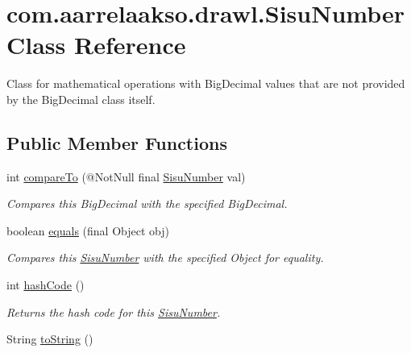 \hypertarget{classcom_1_1aarrelaakso_1_1drawl_1_1_sisu_number}{}\section{com.\+aarrelaakso.\+drawl.\+Sisu\+Number Class Reference}
\label{classcom_1_1aarrelaakso_1_1drawl_1_1_sisu_number}


Class for mathematical operations with Big\+Decimal values that are not provided by the Big\+Decimal class itself.  


\subsection*{Public Member Functions}
\begin{DoxyCompactItemize}
\item 
int \hyperlink{classcom_1_1aarrelaakso_1_1drawl_1_1_sisu_number_a554f83d5273ba11b53e1c82743a7ece0}{compare\+To} (@Not\+Null final \hyperlink{classcom_1_1aarrelaakso_1_1drawl_1_1_sisu_number}{Sisu\+Number} val)
\begin{DoxyCompactList}\small\item\em Compares this Big\+Decimal with the specified Big\+Decimal. \end{DoxyCompactList}\item 
boolean \hyperlink{classcom_1_1aarrelaakso_1_1drawl_1_1_sisu_number_afb509c2c09d10318b136e4defbedd47e}{equals} (final Object obj)
\begin{DoxyCompactList}\small\item\em Compares this \hyperlink{classcom_1_1aarrelaakso_1_1drawl_1_1_sisu_number}{Sisu\+Number} with the specified Object for equality. \end{DoxyCompactList}\item 
int \hyperlink{classcom_1_1aarrelaakso_1_1drawl_1_1_sisu_number_a84f5852d7f79f865cc51d710d09b7032}{hash\+Code} ()
\begin{DoxyCompactList}\small\item\em Returns the hash code for this \hyperlink{classcom_1_1aarrelaakso_1_1drawl_1_1_sisu_number}{Sisu\+Number}. \end{DoxyCompactList}\item 
String \hyperlink{classcom_1_1aarrelaakso_1_1drawl_1_1_sisu_number_a0ed133b435cf93b55afbecb6d28e6cd6}{to\+String} ()
\end{DoxyCompactItemize}
